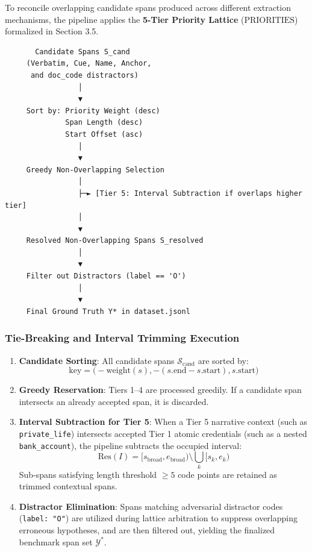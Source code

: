 \documentclass[
]{article}
\providecommand{\tightlist}{%
  \setlength{\itemsep}{0pt}\setlength{\parskip}{0pt}}
\begin{document}
To reconcile overlapping candidate spans produced across different
extraction mechanisms, the pipeline applies the \textbf{5-Tier Priority
Lattice} (\(\text{PRIORITIES}\)) formalized in Section 3.5.

\begin{verbatim}
       Candidate Spans S_cand
     (Verbatim, Cue, Name, Anchor,
      and doc_code distractors)
                 │
                 ▼
     Sort by: Priority Weight (desc)
              Span Length (desc)
              Start Offset (asc)
                 │
                 ▼
     Greedy Non-Overlapping Selection
                 │
                 ├─► [Tier 5: Interval Subtraction if overlaps higher tier]
                 │
                 ▼
     Resolved Non-Overlapping Spans S_resolved
                 │
                 ▼
     Filter out Distractors (label == 'O')
                 │
                 ▼
     Final Ground Truth Y* in dataset.jsonl
\end{verbatim}

\subsubsection{Tie-Breaking and Interval Trimming
Execution}\label{tie-breaking-and-interval-trimming-execution}

\begin{enumerate}
\def\labelenumi{\arabic{enumi}.}
\tightlist
\item
  \textbf{Candidate Sorting}: All candidate spans
  \(\mathcal{S}_{\text{cand}}\) are sorted by:
  \[\text{key} = \bigl(-\text{weight}(s), -(s.\text{end} - s.\text{start}), s.\text{start}\bigr)\]
\item
  \textbf{Greedy Reservation}: Tiers 1--4 are processed greedily. If a
  candidate span intersects an already accepted span, it is discarded.
\item
  \textbf{Interval Subtraction for Tier 5}: When a Tier 5 narrative
  context (such as \texttt{private\_life}) intersects accepted Tier 1
  atomic credentials (such as a nested \texttt{bank\_account}), the
  pipeline subtracts the occupied interval:
  \[\text{Res}(I) = [s_{\text{broad}}, e_{\text{broad}}) \setminus \bigcup_{k} [s_k, e_k)\]
  Sub-spans satisfying length threshold \(\ge 5\) code points are
  retained as trimmed contextual spans.
\item
  \textbf{Distractor Elimination}: Spans matching adversarial distractor
  codes (\texttt{label:\ "O"}) are utilized during lattice arbitration
  to suppress overlapping erroneous hypotheses, and are then filtered
  out, yielding the finalized benchmark span set \(\mathcal{Y}^*\).
\end{enumerate}
\end{document}
